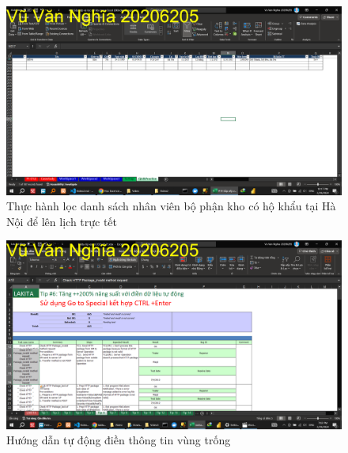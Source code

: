 \documentclass{article}
\begin{document}
\begin{figure}[h]
\centering
\includegraphics[scale = 0.15]{Video2/ThucHanh/7.png}
\caption{Thực hành lọc danh sách nhân viên bộ phận kho có hộ khẩu tại Hà Nội để lên lịch trực tết}
\end{figure}
\begin{figure}[h]
\centering
\includegraphics[scale = 0.15]{Video3/HuongDan/1.png}
\caption{Hướng dẫn tự động điền thông tin vùng trống}
\end{figure}
\end{document}
